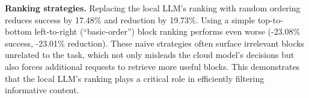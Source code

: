 \textbf{Ranking strategies.} Replacing the local LLM's ranking with random ordering reduces success by 17.48\% and reduction by 19.73\%. Using a simple top-to-bottom left-to-right (``basic-order'') block ranking performs even worse (-23.08\% success, -23.01\% reduction). These naive strategies often surface irrelevant blocks unrelated to the task, which not only misleads the cloud model's decisions but also forces additional requests to retrieve more useful blocks. This demonstrates that the local LLM's ranking plays a critical role in efficiently filtering informative content.
